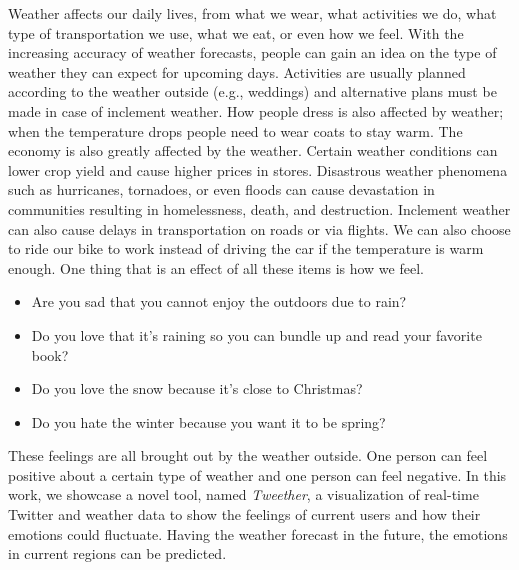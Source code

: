 \maketitle

Weather affects our daily lives, from what we wear, what activities we do, what type of transportation we use, what we eat, or even how we feel. With the increasing accuracy of weather forecasts, people can gain an idea on the type of weather they can expect for upcoming days. Activities are usually planned according to the weather outside (e.g., weddings) and alternative plans must be made in case of inclement weather. How people dress is also affected by weather; when the temperature drops people need to wear coats to stay warm. The economy is also greatly affected by the weather. Certain weather conditions can lower crop yield and cause higher prices in stores. Disastrous weather phenomena such as hurricanes, tornadoes, or even floods can cause devastation in communities resulting in homelessness, death, and destruction. Inclement weather can also cause delays in transportation on roads or via flights. We can also choose to ride our bike to work instead of driving the car if the temperature is warm enough. One thing that is an effect of all these items is how we feel.
\begin{itemize}
\vspace{-.1in}
\setlength{\topsep}{-0.1in}
\setlength{\itemsep}{-0.05in}
\item Are you sad that you cannot enjoy the outdoors due to rain?
\item Do you love that it's raining so you can bundle up and read your favorite book?
\item Do you love the snow because it's close to Christmas?
\item Do you hate the winter because you want it to be spring?
\end{itemize}
\vspace{-0.05in}
These feelings are all brought out by the weather outside. One person can feel positive about a certain type of weather and one person can feel negative. In this work, we showcase a novel tool, named \emph{Tweether}, a visualization of real-time Twitter and weather data to show the feelings of current users and how their emotions could fluctuate. Having the weather forecast %
in the future, the emotions in current regions can be predicted.

